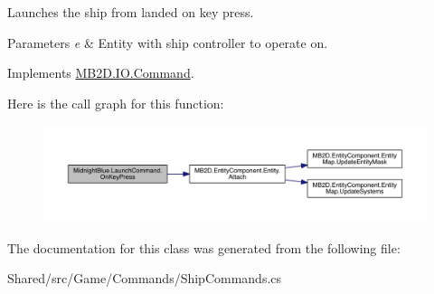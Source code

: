 Launches the ship from landed on key press. 


\begin{DoxyParams}{Parameters}
{\em e} & Entity with ship controller to operate on.\\
\hline
\end{DoxyParams}


Implements \hyperlink{class_m_b2_d_1_1_i_o_1_1_command_ae927e36c0e285848325cc68eddb5fd72}{M\+B2\+D.\+I\+O.\+Command}.

Here is the call graph for this function\+:\nopagebreak
\begin{figure}[H]
\begin{center}
\leavevmode
\includegraphics[width=350pt]{class_midnight_blue_1_1_launch_command_a5da2fdd898111ea59f4f63126c380a3e_cgraph}
\end{center}
\end{figure}


The documentation for this class was generated from the following file\+:\begin{DoxyCompactItemize}
\item 
Shared/src/\+Game/\+Commands/Ship\+Commands.\+cs\end{DoxyCompactItemize}
